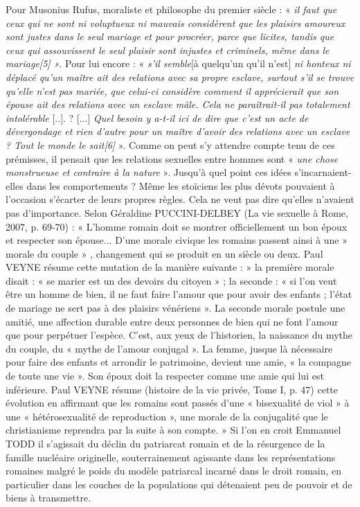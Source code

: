  Pour Musonius Rufus, moraliste et philosophe du premier siècle : « \emph{il faut que ceux qui ne sont ni voluptueux ni mauvais considèrent que les plaisirs amoureux sont justes dans le seul mariage et pour procréer, parce que licites, tandis que ceux qui assouvissent le seul plaisir sont injustes et criminels, même dans le mariage[5] »}. Pour lui encore : « \emph{s'il semble}[à quelqu'un qu'il n'est] \emph{ni honteux ni déplacé qu'un maître ait des relations avec sa propre esclave, surtout s'il se trouve qu'elle n'est pas mariée, que celui-ci considère comment il apprécierait que son épouse ait des relations avec un esclave mâle. Cela ne paraîtrait-il pas totalement intolérable} [..]. ? [...] \emph{Quel besoin y a-t-il ici de dire que c'est un acte de dévergondage et rien d'autre pour un maître d'avoir des relations avec un esclave ? Tout le monde le sait[6]} ». Comme on peut s'y attendre compte tenu de ces prémisses, il pensait que les relations sexuelles entre hommes sont « \emph{une chose monstrueuse et contraire à la nature} ». Jusqu'à quel point ces idées s'incarnaient-elles dans les comportements ? Même les stoïciens les plus dévots pouvaient à l'occasion s'écarter de leurs propres règles. Cela ne veut pas dire qu'elles n'avaient pas d'importance. 
 Selon Géraldine PUCCINI-DELBEY (La vie sexuelle à Rome, 2007, p. 69-70) : « L'homme romain doit se montrer officiellement un bon époux et respecter son épouse... D'une morale civique les romains passent ainsi à une » morale du couple » , changement qui se produit en un siècle ou deux. Paul VEYNE résume cette mutation de la manière suivante : » la première morale disait : « se marier est un des devoirs du citoyen » ; la seconde : « si l'on veut être un homme de bien, il ne faut faire l'amour que pour avoir des enfants ; l'état de mariage ne sert pas à des plaisirs vénériens ». La seconde morale postule une amitié, une affection durable entre deux personnes de bien qui ne font l'amour que pour perpétuer l'espèce. C'est, aux yeux de l'historien, la naissance du mythe du couple, du « mythe de l'amour conjugal ». La femme, jusque là nécessaire pour faire des enfants et arrondir le patrimoine, devient une amie, « la compagne de toute une vie ». Son époux doit la respecter comme une amie qui lui est inférieure. Paul VEYNE résume (histoire de la vie privée, Tome I, p. 47) cette évolution en affirmant que les romains sont passés d'une « bisexualité de viol » à une « hétérosexualité de reproduction », une morale de la conjugalité que le christianisme reprendra par la suite à son compte. » 
 Si l'on en croit Emmanuel TODD il s'agissait du déclin du patriarcat romain et de la résurgence de la famille nucléaire originelle, souterrainement agissante dans les représentations romaines malgré le poids du modèle patriarcal incarné dans le droit romain, en particulier dans les couches de la populations qui détenaient peu de pouvoir et de biens à transmettre. 
